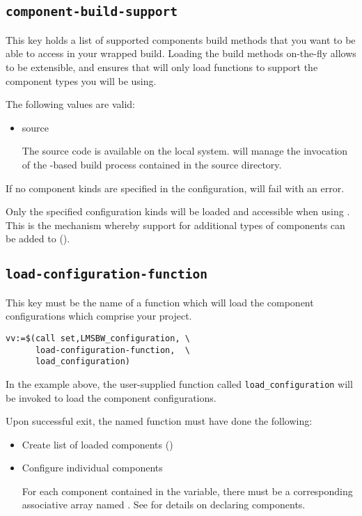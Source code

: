 \subsection{\texttt{component-build-support}}\label{variables:component-build-support}

This key holds a list of supported components build methods that you
want to be able to access in your wrapped build.  Loading the build
methods on-the-fly allows \lmsbw to be extensible, and ensures that
\lmsbw will only load \make functions to support the component types
you will be using.

The following values are valid:

\begin{itemize}
\item source

  The source code is available on the local system.  \lmsbw will
  manage the invocation of the \make-based build process contained
  in the source directory.

\end{itemize}

If no component kinds are specified in the configuration, \lmsbw will
fail with an error.

Only the specified configuration kinds will be loaded and accessible
when using \lmsbw.  This is the mechanism whereby support for
additional types of components can be added to \lmsbw
().

\subsection{\texttt{load-configuration-function}}\label{variables:load-configuration-function}

This key must be the name of a \gnumake function which will load the
component configurations which comprise your project.

\begin{verbatim}
vv:=$(call set,LMSBW_configuration, \
      load-configuration-function,  \
      load_configuration)
\end{verbatim}

In the example above, the user-supplied function called
\texttt{load\_configuration} will be invoked to load the component
configurations.

Upon successful exit, the named function must have done the following:

\begin{itemize}
\item Create list of loaded components
  ()

\item Configure individual components

  For each component contained in the \lmsbwcomponents variable, there
  must be a corresponding associative array named
  \lmsbwcomponent{<component>}.  See \xref{chap:wrapping} for details
  on declaring components.

\end{itemize}


